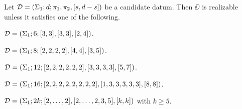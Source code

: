 \begin{theorem} \label{short-partition:th:realizability-on-torus-n-3}
Let $\mathcal{D}=(\Sigma_{1};d;\pi_1,\pi_2,[s,d-s])$ be a candidate datum. Then $\DD$ is realizable unless it satisfies one of the following.
\begin{enumarabic}
\item $\mathcal{D}=(\Sigma_{1};6;[3,3],[3,3],[2,4])$.
\item $\mathcal{D}=(\Sigma_{1};8;[2,2,2,2],[4,4],[3,5])$.
\item $\mathcal{D}=(\Sigma_{1};12;[2,2,2,2,2,2],[3,3,3,3],[5,7])$.
\item $\mathcal{D}=(\Sigma_{1};16;[2,2,2,2,2,2,2,2],[1,3,3,3,3,3],[8,8])$.
\item $\mathcal{D}=(\Sigma_{1};2k;[2,\ldots,2],[2,\ldots,2,3,5],[k,k])$ with $k\ge 5$.
\end{enumarabic}
\end{theorem}
